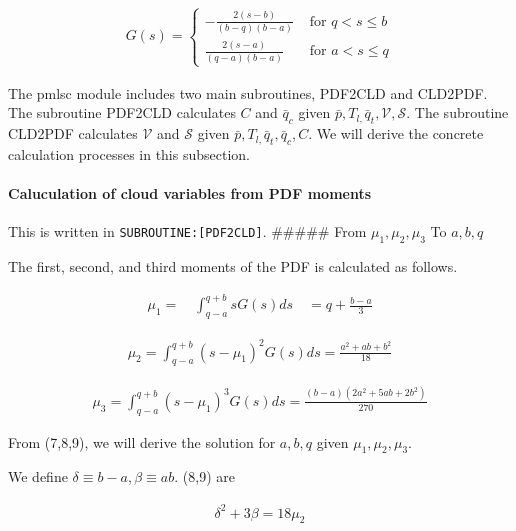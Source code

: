 \begin{eqnarray}
G(s)=\left\{\begin{array}{cl}-\frac{2(s-b)}{(b-q)(b-a)} & \text { for } q<s \leq b \\ \frac{2(s-a)}{(q-a)(b-a)} & \text { for } a<s \leq q\end{array}\right.
\end{eqnarray}

The pmlsc module includes two main subroutines, PDF2CLD and CLD2PDF. The
subroutine PDF2CLD calculates \(C\) and \(\bar{q}_{c}\) given
\(\bar{p}, T_{l,} \bar{q}_{t}, \mathcal{V}, \mathcal{S}\). The
subroutine CLD2PDF calculates \(\mathcal{V}\) and \(\mathcal{S}\) given
\(\bar{p}, T_{l,} \bar{q}_{t}, \bar{q}_{c}, C\). We will derive the
concrete calculation processes in this subsection.

\hypertarget{caluculation-of-cloud-variables-from-pdf-moments}{%
\paragraph{Caluculation of cloud variables from PDF
moments}\label{caluculation-of-cloud-variables-from-pdf-moments}}

This is written in \texttt{SUBROUTINE:{[}PDF2CLD{]}}. \#\#\#\#\# From
\(\mu_{1}, \mu_{2}, \mu_{3}\) To \(a,b,q\)

The first, second, and third moments of the PDF is calculated as
follows.

\begin{eqnarray}
\mu_{1}=\quad \int_{q-a}^{q+b}sG(s)ds \quad=q+\frac{b-a}{3}
\label{E08-7}
\end{eqnarray}

\begin{eqnarray}
\mu_{2}=\int_{q-a}^{q+b}\left(s-\mu_{1}\right)^{2} G(s)ds=\frac{a^{2}+a b+b^{2}}{18}
\label{E08-8}
\end{eqnarray}

\begin{eqnarray}
\mu_{3}=\int_{q-a}^{q+b}\left(s-\mu_{1}\right)^{3} G(s)ds=\frac{(b-a)\left(2 a^{2}+5 a b+2 b^{2}\right)}{270}
\label{E08-9}
\end{eqnarray}

From (7,8,9), we will derive the solution for \(a,b , q\) given
\(\mu_{1}, \mu_{2}, \mu_{3}\).

We define \(\delta \equiv b-a, \beta \equiv a b\). (8,9) are

\begin{eqnarray}
\delta^{2}+3 \beta=18 \mu_{2}
\end{eqnarray}

